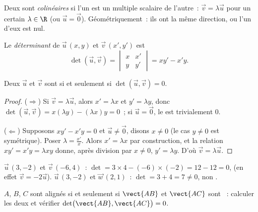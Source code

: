 \begin{definition}\label{def:g11:vect:collinear}
Deux  sont \emph{colinéaires} si l'un
est un multiple scalaire de l'autre~: $\vec v = \lambda \vec u$ pour un
certain $\lambda \in \R$ (ou $\vec u = \vec 0$). Géométriquement~: ils ont
la même direction, ou l'un d'eux est nul.
\end{definition}

\begin{definition}[Déterminant]\label{def:g11:vect:det}
Le \emph{déterminant} de $\vec u\,(x, y)$ et
$\vec v\,(x', y')$ est
\[
\det(\vec u, \vec v) =
\begin{vmatrix} x & x' \\ y & y' \end{vmatrix}
= x y' - x' y .
\]
\end{definition}

\begin{theorem}\label{thm:g11:vect:collinearity}
Deux  $\vec u$ et $\vec v$ sont  si et seulement si
$\det(\vec u, \vec v) = 0$.
\end{theorem}

\begin{proof}
($\Rightarrow$) Si $\vec v = \lambda\vec u$, alors $x' = \lambda x$ et
$y' = \lambda y$, donc
$\det(\vec u, \vec v) = x(\lambda y) - (\lambda x)y = 0$~; si
$\vec u = \vec 0$, le  est trivialement $0$.

($\Leftarrow$) Supposons $xy' - x'y = 0$ et $\vec u \neq \vec 0$, disons
$x \neq 0$ (le cas $y \neq 0$ est symétrique). Poser
$\lambda = \frac{x'}{x}$. Alors $x' = \lambda x$ par construction, et la
relation $xy' = x'y = \lambda x y$ donne, après division par $x \neq 0$,
$y' = \lambda y$. D'où $\vec v = \lambda \vec u$.
\end{proof}

\begin{example}\label{ex:g11:vect:collinear}
$\vec u\,(3, -2)$ et $\vec v\,(-6, 4)$~:
$\det = 3 \times 4 - (-6) \times (-2) = 12 - 12 = 0$,  (en
effet $\vec v = -2\vec u$). $\vec u\,(3, -2)$ et $\vec w\,(2, 1)$~:
$\det = 3 + 4 = 7 \neq 0$, non .
\end{example}

\begin{method}\label{met:g11:vect:alignment}
$A$, $B$, $C$ sont alignés si et seulement si $\vect{AB}$ et $\vect{AC}$
sont ~: calculer les deux  et vérifier
$\det\bigl(\vect{AB}, \vect{AC}\bigr) = 0$.
\end{method}

